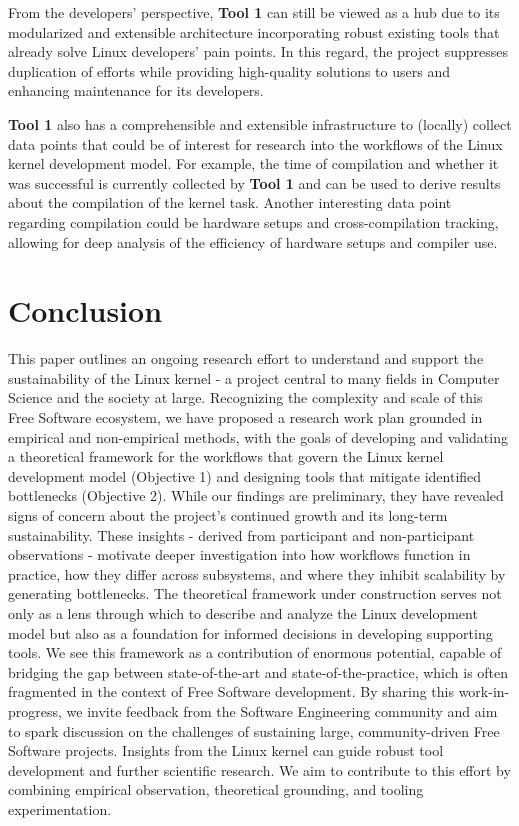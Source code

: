 \documentclass[sigconf]{acmart} %
\begin{document}
From the developers' perspective, \textbf{Tool 1} can still be viewed as a hub
due to its modularized and extensible architecture incorporating robust existing
tools that already solve Linux developers' pain points. In this regard, the
project suppresses duplication of efforts while providing high-quality solutions
to users and enhancing maintenance for its developers.

\textbf{Tool 1} also has a comprehensible and extensible infrastructure to
(locally) collect data points that could be of interest for research into the
workflows of the Linux kernel development model. For example, the time of
compilation and whether it was successful is currently collected by \textbf{Tool
1} and can be used to derive results about the compilation of the kernel task.
Another interesting data point regarding compilation could be hardware setups
and cross-compilation tracking, allowing for deep analysis of the efficiency of
hardware setups and compiler use.

\section{Conclusion}
\label{sec:conclusion}

This paper outlines an ongoing research effort to understand and support the
sustainability of the Linux kernel - a project central to many fields in
Computer Science and the society at large. Recognizing the complexity and scale
of this Free Software ecosystem, we have proposed a research work plan grounded
in empirical and non-empirical methods, with the goals of developing and
validating a theoretical framework for the workflows that govern the Linux
kernel development model (Objective 1) and designing tools that mitigate
identified bottlenecks (Objective 2). While our findings are preliminary, they
have revealed signs of concern about the project's continued growth and its
long-term sustainability. These insights - derived from participant and
non-participant observations - motivate deeper investigation into how workflows
function in practice, how they differ across subsystems, and where they inhibit
scalability by generating bottlenecks.  The theoretical framework under
construction serves not only as a lens through which to describe and analyze the
Linux development model but also as a foundation for informed decisions in
developing supporting tools. We see this framework as a contribution of enormous
potential, capable of bridging the gap between state-of-the-art and
state-of-the-practice, which is often fragmented in the context of Free Software
development. By sharing this work-in-progress, we invite feedback from the
Software Engineering community and aim to spark discussion on the challenges of
sustaining large, community-driven Free Software projects. Insights from the
Linux kernel can guide robust tool development and further scientific research.
We aim to contribute to this effort by combining empirical observation,
theoretical grounding, and tooling experimentation.
\end{document}
